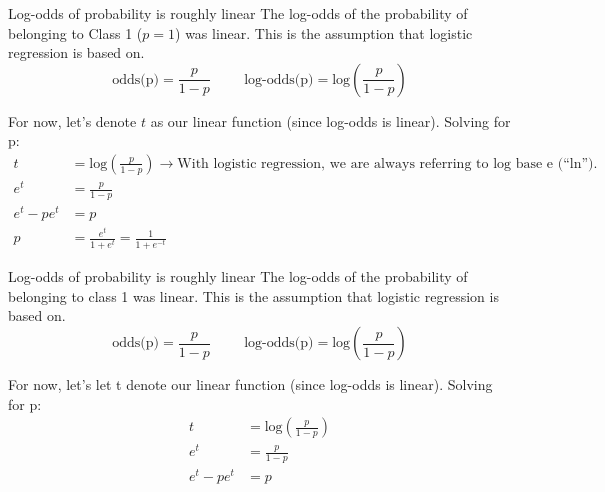 \documentclass[aspectratio=169]{../latex_main/tntbeamer}  %
\begin{document}
	
	\begin{frame}{Log-odds of probability is roughly linear}
	    The log-odds of the probability of belonging to Class 1 ($p = 1$) was linear. This is the assumption that logistic regression is based on. \\
	    \begin{equation*}
	        \text{odds(p)} = \frac{p}{1 - p}\hspace{1cm} \text{log-odds(p)} = \text{log}\left(\frac{p}{1 - p}\right)
	    \end{equation*}
	    
	    For now, let’s denote $t$ as our linear function (since log-odds is linear). Solving for p:
	    \begin{align*}
	        t &= \text{log}\left(\frac{p}{1 - p}\right)\rightarrow \text{With logistic regression, we are always referring to log base e (“ln”).
} \\
	        e^t &= \frac{p}{1 - p}\\
	        e^t - pe^t &= p\\
	        p &= \frac{e^t}{1 + e^t} = \frac{1}{1 + e^{-t}}
	    \end{align*}
	\end{frame}
	
	\begin{frame}{Log-odds of probability is roughly linear}
	    The log-odds of the probability of belonging to class 1 was linear. This is the assumption that logistic regression is based on. \\
	    \begin{equation*}
	        \text{odds(p)} = \frac{p}{1 - p}\hspace{1cm} \text{log-odds(p)} = \text{log}\left(\frac{p}{1 - p}\right)
	    \end{equation*}
	    
	    For now, let’s let t denote our linear function (since log-odds is linear). Solving for p:
	    \begin{align*}
	        t &= \text{log}\left(\frac{p}{1 - p}\right)\\
	        e^t &= \frac{p}{1 - p}\\
	        e^t - pe^t &= p\\
	    \end{align*}
	\end{frame}
	
	
	
\end{document}
